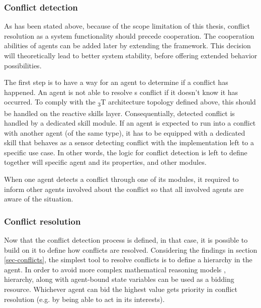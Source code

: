 \documentclass[0main.tex]{subfiles}
\begin{document}

\subsubsection{Conflict detection}

As has been stated above, because of the scope limitation of this thesis, 
conflict resolution as a system functionality should precede cooperation. The cooperation 
abilities of agents can be added later by extending the framework.
This decision will theoretically lead to better system stability, before offering extended
behavior possibilities. 

The first step is to have a way for an agent to determine if a conflict has happened. An agent is not
able to resolve s conflict if it doesn't know it has occurred. To comply with the \textsubscript{3}T
architecture topology defined above, this should be handled on the reactive skills layer. 
Consequentially, detected conflict is handled by a dedicated skill module. If an
agent is expected to run into a conflict with another agent (of the same 
 type), it has to be equipped with a dedicated skill that behaves as a sensor detecting conflict 
with the implementation left to a specific use case. In other words, the logic for conflict detection is 
left to define together will specific agent and its properties, and other modules.

When one agent detects a conflict through one of its modules, it required to inform other
agents involved about the conflict so that all involved agents are aware of the situation. 

\subsubsection{Conflict resolution}

Now that the conflict detection process is defined, in that case, it is possible to build
on it to define how conflicts are resolved. Considering the findings in section
\ref{sec-conflicts}, the simplest tool to resolve conflicts is to define a hierarchy in the
agent. In order to avoid more complex mathematical reasoning models \cite{Binder2022},
hierarchy, along with agent-bound state variables can be used as a bidding resource. Whichever
agent can bid the highest value gets priority in conflict resolution (e.g. by being
able to act in its interests).
\end{document}

